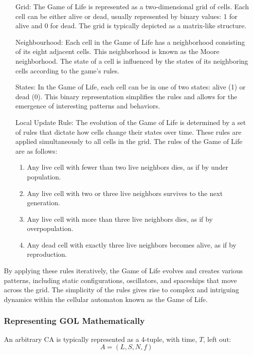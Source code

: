 \begin{enumerate}[align=left]
	\item[Grid:] The Game of Life is represented as a two-dimensional grid of cells. Each cell can be either alive or dead, usually represented by binary values: 1 for alive and 0 for dead. The grid is typically depicted as a matrix-like structure.
	\item[Neighbourhood:] Each cell in the Game of Life has a neighborhood consisting of its eight adjacent cells. This neighborhood is known as the Moore neighborhood. The state of a cell is influenced by the states of its neighboring cells according to the game's rules.
	\item[States:] In the Game of Life, each cell can be in one of two states: alive (1) or dead (0). This binary representation simplifies the rules and allows for the emergence of interesting patterns and behaviors.
	\item[Local Update Rule:] The evolution of the Game of Life is determined by a set of rules that dictate how cells change their states over time. These rules are applied simultaneously to all cells in the grid. The rules of the Game of Life are as follows:
	\begin{enumerate}
		\item Any live cell with fewer than two live neighbors dies, as if by under population.
		\item Any live cell with two or three live neighbors survives to the next generation.
		\item Any live cell with more than three live neighbors dies, as if by overpopulation.
		\item Any dead cell with exactly three live neighbors becomes alive, as if by reproduction.
	\end{enumerate}
\end{enumerate}

By applying these rules iteratively, the Game of Life evolves and creates various patterns, including static configurations, oscillators, and spaceships that move across the grid. The simplicity of the rules gives rise to complex and intriguing dynamics within the cellular automaton known as the Game of Life.

\subsubsection*{Representing GOL Mathematically}

 An arbitrary CA is typically represented as a 4-tuple, with time, $T$, left out:
\begin{equation}
	A = (L, S, N, f)
\end{equation}

